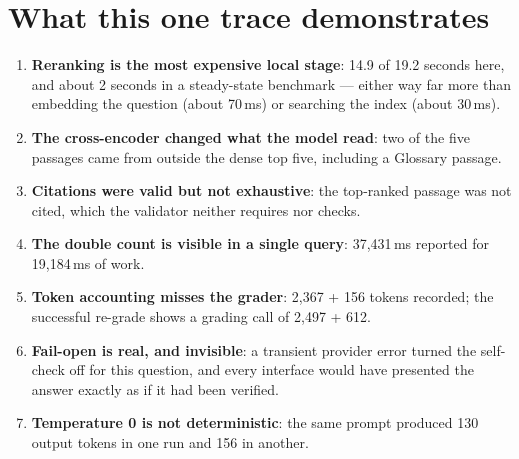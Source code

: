 \section{What this one trace demonstrates}

\begin{enumerate}
  \item \textbf{Reranking is the most expensive local stage}: 14.9 of 19.2 seconds here, and about 2 seconds in a steady-state benchmark --- either way far more than embedding the question (about 70\,ms) or searching the index (about 30\,ms).
  \item \textbf{The cross-encoder changed what the model read}: two of the five passages came from outside the dense top five, including a Glossary passage.
  \item \textbf{Citations were valid but not exhaustive}: the top-ranked passage was not cited, which the validator neither requires nor checks.
  \item \textbf{The double count is visible in a single query}: 37,431\,ms reported for 19,184\,ms of work.
  \item \textbf{Token accounting misses the grader}: 2,367 + 156 tokens recorded; the successful re-grade shows a grading call of 2,497 + 612.
  \item \textbf{Fail-open is real, and invisible}: a transient provider error turned the self-check off for this question, and every interface would have presented the answer exactly as if it had been verified.
  \item \textbf{Temperature 0 is not deterministic}: the same prompt produced 130 output tokens in one run and 156 in another.
\end{enumerate}
